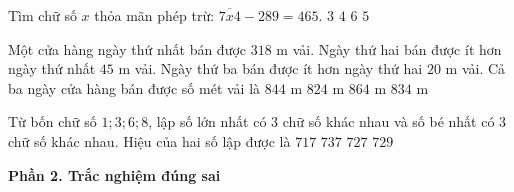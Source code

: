 \begin{ex} %
Tìm chữ số $x$ thỏa mãn phép trừ: $\overline{7x4} - 289 = 465$.
\choice
{$3$}
{$4$}
{$6$}
{\True $5$}
\end{ex}

\begin{ex} %
Một cửa hàng ngày thứ nhất bán được $318\text{ m}$ vải. Ngày thứ hai bán được ít hơn ngày thứ nhất $45\text{ m}$ vải. Ngày thứ ba bán được ít hơn ngày thứ hai $20\text{ m}$ vải. Cả ba ngày cửa hàng bán được số mét vải là
\choice
{\True $844\text{ m}$}
{$824\text{ m}$}
{$864\text{ m}$}
{$834\text{ m}$}
\end{ex}

\begin{ex} %
Từ bốn chữ số $1; 3; 6; 8$, lập số lớn nhất có 3 chữ số khác nhau và số bé nhất có 3 chữ số khác nhau. Hiệu của hai số lập được là
\choice
{$717$}
{$737$}
{\True $727$}
{$729$}
\end{ex}

\textbf{Phần 2. Trắc nghiệm đúng sai}

